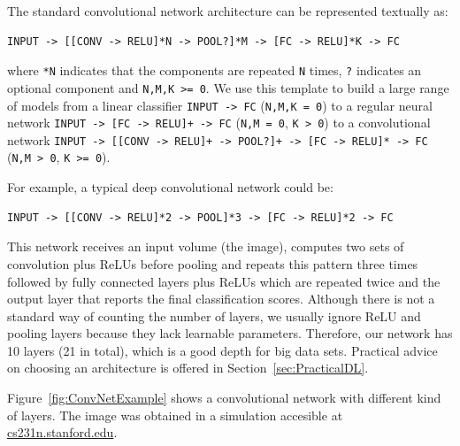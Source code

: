 \bigskip

The standard convolutional network architecture can be represented textually as:
\begin{verbatim}
INPUT -> [[CONV -> RELU]*N -> POOL?]*M -> [FC -> RELU]*K -> FC
\end{verbatim}
where \texttt{*N} indicates that the components are repeated \texttt{N} times, \texttt{?} indicates an optional component and \texttt{N,M,K >= 0}. We use this template to build a large range of models from a linear classifier \texttt{INPUT -> FC} (\texttt{N,M,K = 0}) to a regular neural network \texttt{INPUT -> [FC -> RELU]+ -> FC} (\texttt{N,M = 0}, \texttt{K > 0}) to a convolutional network \texttt{INPUT -> [[CONV -> RELU]+ -> POOL?]+ -> [FC -> RELU]* -> FC} (\texttt{N,M > 0}, \texttt{K >= 0}).

For example, a typical deep convolutional network could be:
\begin{verbatim}
INPUT -> [[CONV -> RELU]*2 -> POOL]*3 -> [FC -> RELU]*2 -> FC
\end{verbatim}
This network receives an input volume (the image), computes two sets of convolution plus ReLUs before pooling and repeats this pattern three times followed by fully connected layers plus ReLUs which are repeated twice and the output layer that reports the final classification scores. Although there is not a standard way of counting the number of layers, we usually ignore ReLU and pooling layers because they lack learnable parameters. Therefore, our network has 10 layers (21 in total), which is a good depth for big data sets. Practical advice on choosing an architecture is offered in Section~\ref{sec:PracticalDL}.

Figure~\ref{fig:ConvNetExample} shows a convolutional network with different kind of layers. The image was obtained in a simulation accesible at \url{cs231n.stanford.edu}.

